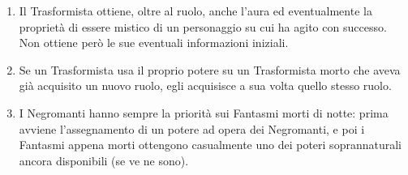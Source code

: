\documentclass[a4paper,10pt]{article}
\begin{document}
\begin{enumerate}
	\item Il Trasformista ottiene, oltre al ruolo, anche l'aura ed eventualmente la proprietà di essere mistico di un personaggio su cui ha agito con successo. Non ottiene però le sue eventuali informazioni iniziali.
	
	\item Se un Trasformista usa il proprio potere su un Trasformista morto che aveva già acquisito un nuovo ruolo, egli acquisisce a sua volta quello stesso ruolo. %
	
	
 
	
	
	\item I Negromanti hanno sempre la priorità sui Fantasmi morti di notte: prima avviene l'assegnamento di un potere ad opera dei Negromanti, e poi i Fantasmi appena morti ottengono casualmente uno dei poteri soprannaturali ancora disponibili (se ve ne sono).


\end{enumerate}
\end{document}
